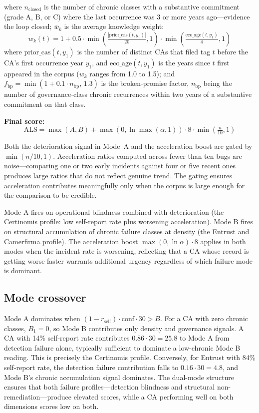 \documentclass[10pt,twocolumn,letterpaper]{article}
\begin{document}
where $n_{\text{closed}}$ is the number of chronic classes with a substantive
commitment (grade A, B, or C) where the last occurrence was 3 or more years
ago---evidence the loop closed; $\bar{w}_k$ is the average knowledge weight:
\[
w_k(t) = 1 + 0.5 \cdot \min\!\left(\tfrac{|\text{prior\_cas}(t,y_1)|}{20}, 1\right)
              \cdot \min\!\left(\tfrac{\text{eco\_age}(t,y_1)}{4}, 1\right)
\]
where $\text{prior\_cas}(t, y_1)$ is the number of distinct CAs that filed tag $t$
before the CA's first occurrence year $y_1$, and $\text{eco\_age}(t, y_1)$ is the
years since $t$ first appeared in the corpus ($w_k$ ranges from 1.0 to 1.5);
and $f_{\text{bp}} = \min(1 + 0.1 \cdot n_{\text{bp}},\, 1.3)$ is the broken-promise
factor, $n_{\text{bp}}$ being the number of governance-class chronic recurrences
within two years of a substantive commitment on that class.

\textbf{Final score:}
\[
\text{ALS} = \max(A, B) + \max(0, \ln\!\max(\alpha, 1)) \cdot 8 \cdot \min\!\left(\tfrac{n}{10}, 1\right)
\]

Both the deterioration signal in Mode~A and the acceleration boost are gated by
$\min(n/10, 1)$. Acceleration ratios computed across fewer than ten bugs are
noise---comparing one or two early incidents against four or five recent ones
produces large ratios that do not reflect genuine trend. The gating ensures
acceleration contributes meaningfully only when the corpus is large enough for
the comparison to be credible.

Mode A fires on operational blindness combined with deterioration (the Certinomis
profile: low self-report rate plus worsening acceleration). Mode B fires on structural
accumulation of chronic failure classes at density (the Entrust and Camerfirma
profile). The acceleration boost $\max(0, \ln\alpha)\cdot 8$ applies in both
modes when the incident rate is worsening, reflecting that a CA whose record is
getting worse faster warrants additional urgency regardless of which failure mode
is dominant.

\subsection{Mode crossover}

Mode A dominates when $(1-r_{\text{self}}) \cdot \text{conf} \cdot 30 > B$. For a CA
with zero chronic classes, $B_1 = 0$, so Mode B contributes only density and governance
signals. A CA with 14\% self-report rate contributes $0.86 \cdot 30 = 25.8$ to
Mode A from detection failure alone, typically sufficient to dominate a low-chronic
Mode B reading. This is precisely the Certinomis profile. Conversely, for Entrust with
84\% self-report rate, the detection failure contribution falls to $0.16 \cdot 30 = 4.8$,
and Mode B's chronic accumulation signal dominates. The dual-mode structure ensures that
both failure profiles---detection blindness and structural non-remediation---produce
elevated scores, while a CA performing well on both dimensions scores low on both.
\end{document}
